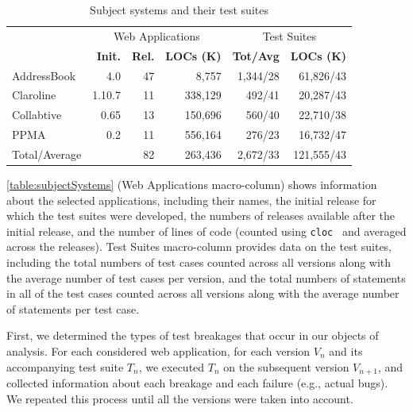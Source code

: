\begin{table}[h]
\setlength{\tabcolsep}{2pt}
\renewcommand{\arraystretch}{0.9}
\centering
\caption{Subject systems and their test suites}
\begin{tabular}{lrrr@{\hskip 2em}r@{\hskip 1em}r}
\toprule

& \multicolumn{3}{c}{\sc Web Applications} 
& \multicolumn{2}{c}{\sc Test Suites} \\

\cmidrule(r){2-4} \cmidrule(r){5-6}

& {\textbf{Init.}} 
& {\textbf{Rel.}}
& {\textbf{LOCs (K)}} 
& {\textbf{Tot/Avg}} 
& {\textbf{LOCs (K)}}   \\

\midrule
AddressBook   & 4.0       & 47       & 8,757   & 1,344/28        & 61,826/43          \\
Claroline     & 1.10.7    & 11       & 338,129 & 492/41        & 20,287/43          \\
Collabtive    & 0.65      & 13       & 150,696 & 560/40        & 22,710/38          \\
PPMA          & 0.2       & 11       & 556,164 & 276/23        & 16,732/47          \\
\midrule
Total/Average &           & 82       & 263,436 & 2,672/33        & 121,555/43 \\

\bottomrule
\end{tabular}
\label{table:subjectSystems}
\end{table}

\autoref{table:subjectSystems} (Web Applications macro-column) shows information about the selected applications, including their names, the initial release for which the test suites were developed, the numbers of releases available after the initial release, and the number of lines of code (counted using \texttt{cloc}~\cite{cloc} and averaged across the releases).
Test Suites macro-column provides data on the test suites, including the total numbers of test cases counted across all versions along with the average number of test cases per version, and the total numbers of statements in all of the test cases counted across all versions along with the average number of statements per test case.

\label{sec:procedure}
First, we determined the types of test breakages that occur in our objects of analysis. For each considered web application, for each version $V_n$ and its accompanying test suite $T_n$, we executed $T_n$ on the subsequent version $V_{n+1}$, and collected information about each breakage and each failure (e.g., actual bugs). We repeated this process until all the versions were taken into account. 

